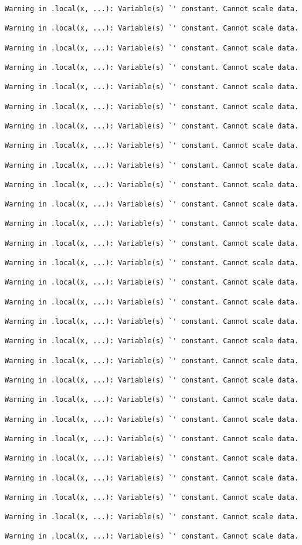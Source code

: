 \documentclass[
  letterpaper,
  DIV=11,
  numbers=noendperiod]{scrartcl}
\begin{document}
\begin{verbatim}
Warning in .local(x, ...): Variable(s) `' constant. Cannot scale data.

Warning in .local(x, ...): Variable(s) `' constant. Cannot scale data.

Warning in .local(x, ...): Variable(s) `' constant. Cannot scale data.

Warning in .local(x, ...): Variable(s) `' constant. Cannot scale data.

Warning in .local(x, ...): Variable(s) `' constant. Cannot scale data.

Warning in .local(x, ...): Variable(s) `' constant. Cannot scale data.

Warning in .local(x, ...): Variable(s) `' constant. Cannot scale data.

Warning in .local(x, ...): Variable(s) `' constant. Cannot scale data.

Warning in .local(x, ...): Variable(s) `' constant. Cannot scale data.

Warning in .local(x, ...): Variable(s) `' constant. Cannot scale data.

Warning in .local(x, ...): Variable(s) `' constant. Cannot scale data.

Warning in .local(x, ...): Variable(s) `' constant. Cannot scale data.

Warning in .local(x, ...): Variable(s) `' constant. Cannot scale data.

Warning in .local(x, ...): Variable(s) `' constant. Cannot scale data.

Warning in .local(x, ...): Variable(s) `' constant. Cannot scale data.

Warning in .local(x, ...): Variable(s) `' constant. Cannot scale data.

Warning in .local(x, ...): Variable(s) `' constant. Cannot scale data.

Warning in .local(x, ...): Variable(s) `' constant. Cannot scale data.

Warning in .local(x, ...): Variable(s) `' constant. Cannot scale data.

Warning in .local(x, ...): Variable(s) `' constant. Cannot scale data.

Warning in .local(x, ...): Variable(s) `' constant. Cannot scale data.

Warning in .local(x, ...): Variable(s) `' constant. Cannot scale data.

Warning in .local(x, ...): Variable(s) `' constant. Cannot scale data.

Warning in .local(x, ...): Variable(s) `' constant. Cannot scale data.

Warning in .local(x, ...): Variable(s) `' constant. Cannot scale data.

Warning in .local(x, ...): Variable(s) `' constant. Cannot scale data.

Warning in .local(x, ...): Variable(s) `' constant. Cannot scale data.

Warning in .local(x, ...): Variable(s) `' constant. Cannot scale data.
\end{verbatim}
\end{document}
